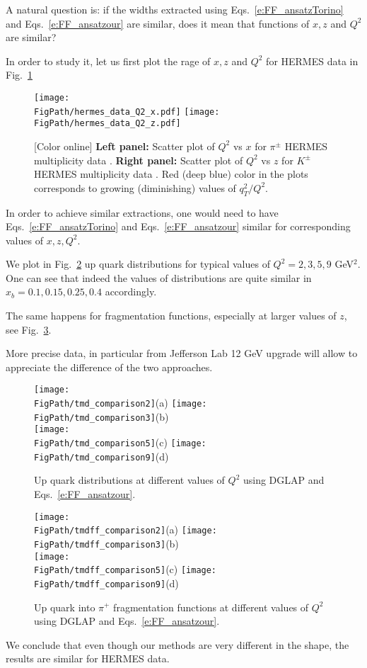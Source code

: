 \documentclass[final,3p,times,onecolumn,sort&compress,hidelinks]{elsarticle}
\newcommand{\xbj}{x_b}
\newcommand*{\FigPath}{../Figs/}%
\begin{document}
A natural question is: if the widths extracted using Eqs.~\eqref{e:FF_ansatzTorino} and Eqs.~\eqref{e:FF_ansatzour} are similar, does it mean that functions of $x,z$ and $Q^2$ are similar?

In order to study it, let us first plot the rage of $x,z$ and $Q^2$ for HERMES data in Fig.~\ref{Fig:hermes_data_Q2}
\begin{figure}[htb!]
\centering
\texttt{[image: \\FigPath/hermes\_data\_Q2\_x.pdf]}
\texttt{[image: \\FigPath/hermes\_data\_Q2\_z.pdf]}
\caption{\label{Fig:hermes_data_Q2}
[Color online] {\bf Left panel:} Scatter plot of $Q^2$ vs $x$ for $\pi^\pm$ HERMES multiplicity data . {\bf Right panel:} 
Scatter plot of $Q^2$ vs $z$ for $K^\pm$ HERMES multiplicity data .  Red (deep blue) color in the plots corresponds to growing (diminishing) values of $q_T^2/Q^2$.
}
\end{figure}

In order to achieve similar extractions, one would need to have Eqs.~\eqref{e:FF_ansatzTorino} and Eqs.~\eqref{e:FF_ansatzour} similar for corresponding values of $x,z,Q^2$.

We plot in Fig.~\ref{Fig:comparison} up quark distributions for typical values of $Q^2=2,3,5,9$ GeV$^2$.
One can see that indeed the values of distributions are quite similar in $\xbj = 0.1, 0.15, 0.25, 0.4$ accordingly.

The same happens for fragmentation functions, especially at larger values of $z$, see Fig.~\ref{Fig:comparison_ff}.

More precise data, in particular from Jefferson Lab 12 GeV upgrade will allow to appreciate the difference of the two approaches.
\begin{figure}[htb!]
\centering
\texttt{[image: \\FigPath/tmd\_comparison2]}{\tiny(a)}%
\texttt{[image: \\FigPath/tmd\_comparison3]}{\tiny(b)}\\%
\texttt{[image: \\FigPath/tmd\_comparison5]}{\tiny(c)}%
\texttt{[image: \\FigPath/tmd\_comparison9]}{\tiny(d)}%
\caption{\label{Fig:comparison}
Up quark distributions  at different values of $Q^2$ using DGLAP and Eqs.~\ref{e:FF_ansatzour}.
}
\end{figure}

\begin{figure}[htb!]
\centering
\texttt{[image: \\FigPath/tmdff\_comparison2]}{\tiny(a)}%
\texttt{[image: \\FigPath/tmdff\_comparison3]}{\tiny(b)}\\%
\texttt{[image: \\FigPath/tmdff\_comparison5]}{\tiny(c)}%
\texttt{[image: \\FigPath/tmdff\_comparison9]}{\tiny(d)}%
\caption{\label{Fig:comparison_ff}
Up quark into $\pi^+$ fragmentation functions at different values of $Q^2$ using DGLAP and Eqs.~\ref{e:FF_ansatzour}.
}
\end{figure}

We conclude that even though our methods are very different in the shape, the results are similar for HERMES data.





\end{document}
